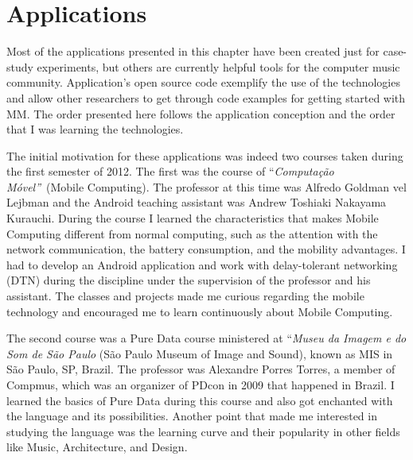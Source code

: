 \chapter{Applications}
\label{cap:applications}





Most of the applications presented in this chapter have been created just for case-study experiments, but others are currently helpful tools for the computer music community.
Application's open source code exemplify the use of the technologies and allow other researchers to get through code examples for getting started with MM.
The order presented here follows the application conception and the order that I was learning the technologies.

The initial motivation for these applications was indeed two courses taken during the first semester of 2012.
The first was the course of ``\textit{Computação Móvel''}~(Mobile Computing).
The professor at this time was Alfredo Goldman vel Lejbman and the Android teaching assistant was Andrew Toshiaki Nakayama Kurauchi. %
During the course I learned the characteristics that makes Mobile Computing different from normal computing, such as the attention with the network communication, the battery consumption, and the mobility advantages. %
I had to develop an Android application and work with delay-tolerant networking (DTN) during the discipline under the supervision of the professor and his assistant.
The classes and projects made me curious regarding the mobile technology and encouraged me to learn continuously about Mobile Computing.

The second course was a Pure Data course ministered at ``\textit{Museu da Imagem e do Som de São Paulo} (São Paulo Museum of Image and Sound), known as MIS in São Paulo, SP, Brazil.
The professor was Alexandre Porres Torres, a member of Compmus, which was an organizer of PDcon in 2009 that happened in Brazil.
I learned the basics of Pure Data during this course and also got enchanted with the language and its possibilities.
Another point that made me interested in studying the language was the learning curve and their popularity in other fields like Music, Architecture, and Design.


